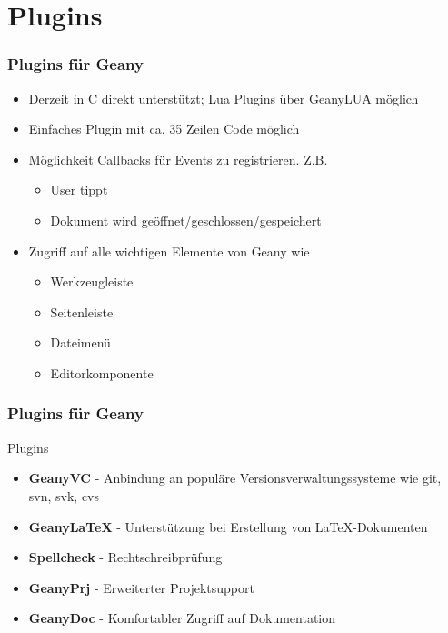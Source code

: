 \section{Plugins}
\begin{frame}
	\frametitle{Plugins für Geany}
	\begin{block}{}
		\begin{itemize}
			\item Derzeit in C direkt unterstützt; Lua Plugins über
				  GeanyLUA möglich
			\item Einfaches Plugin mit ca. 35 Zeilen Code möglich
			\item Möglichkeit Callbacks für Events zu registrieren. Z.B.
				\begin{itemize}
					\item User tippt
					\item Dokument wird geöffnet/geschlossen/gespeichert
				\end{itemize}
			\item Zugriff auf alle wichtigen Elemente von Geany wie
				\begin{itemize}
					\item Werkzeugleiste
					\item Seitenleiste
					\item Dateimenü
					\item Editorkomponente
				\end{itemize}
		\end{itemize}
	\end{block}
\end{frame}

\begin{frame}
	\frametitle{Plugins für Geany}
	\begin{block}{Plugins}
		\begin{itemize}
			\item \textbf{GeanyVC} - Anbindung an populäre
				Versions\-ver\-waltungs\-systeme wie git, svn, svk, cvs
			\item \textbf{GeanyLaTeX} - Unterstützung bei Erstellung von
				\LaTeX-Dokumenten
			\item \textbf{Spellcheck} - Rechtschreibprüfung
			\item \textbf{GeanyPrj} - Erweiterter Projektsupport
			\item \textbf{GeanyDoc} - Komfortabler Zugriff auf Dokumentation
		\end{itemize}
	\end{block}
\end{frame}

